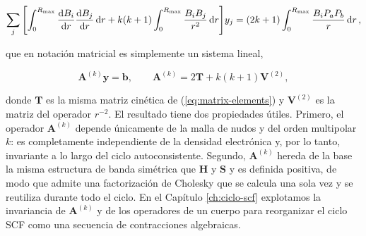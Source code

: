 \begin{equation}
\label{eq:poisson-weak-metodo}
  \sum_j \qty[ \int_0^{R_{\text{max}}} \dv{B_i}{r}\dv{B_j}{r} \dd{r} + k(k+1)\int_0^{R_{\text{max}}} \frac{B_i B_j}{r^2} \dd{r} ] y_j = (2k+1)\int_0^{R_{\text{max}}} \frac{B_i P_a P_b}{r} \dd{r},
\end{equation}

que en notación matricial es simplemente un sistema lineal,

\begin{equation}
\label{eq:poisson-linear-metodo}
  \bm{A}^{(k)} \bm{y} = \bm{b}, \qquad \bm{A}^{(k)} = 2\bm{T} + k(k+1)\bm{V}^{(2)},
\end{equation}

donde $\bm{T}$ es la misma matriz cinética de (\ref{eq:matrix-elements}) y $\bm{V}^{(2)}$ es la matriz del operador $r^{-2}$. El resultado tiene dos propiedades útiles. Primero, el operador $\bm{A}^{(k)}$ depende únicamente de la malla de nudos y del orden multipolar $k$: es completamente independiente de la densidad electrónica y, por lo tanto, invariante a lo largo del ciclo autoconsistente. Segundo, $\bm{A}^{(k)}$ hereda de la base la misma estructura de banda simétrica que $\bm{H}$ y $\bm{S}$ y es definida positiva, de modo que admite una factorización de Cholesky que se calcula una sola vez y se reutiliza durante todo el ciclo. En el Capítulo \ref{ch:ciclo-scf} explotamos la invariancia de $\bm{A}^{(k)}$ y de los operadores de un cuerpo para reorganizar el ciclo SCF como una secuencia de contracciones algebraicas.

